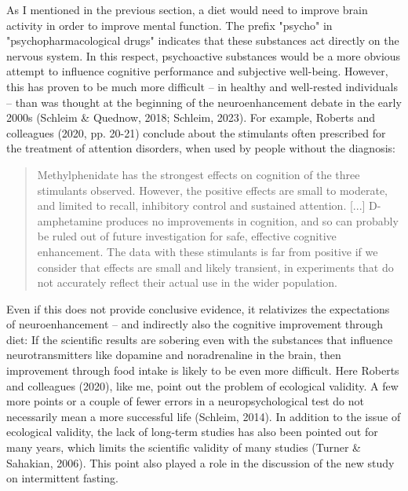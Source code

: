 \documentclass[authordate, empirical]{jote-new-article}
\begin{document}
As I mentioned in the previous section, a diet would need to improve brain activity in order to improve mental function. The prefix "psycho" in "psychopharmacological drugs" indicates that these substances act directly on the nervous system. In this respect, psychoactive substances would be a more obvious attempt to influence cognitive performance and subjective well-being. However, this has proven to be much more difficult -- in healthy and well-rested individuals -- than was thought at the beginning of the neuroenhancement debate in the early 2000s (Schleim \& Quednow, 2018; Schleim, 2023). For example, Roberts and colleagues (2020, pp. 20-21) conclude about the stimulants often prescribed for the treatment of attention disorders, when used by people without the diagnosis:






\begin{quote}

  Methylphenidate has the strongest effects on cognition of the three stimulants observed. However, the positive effects are small to moderate, and limited to recall, inhibitory control and sustained attention. [...] D-amphetamine produces no improvements in cognition, and so can probably be ruled out of future investigation for safe, effective cognitive enhancement. The data with these stimulants is far from positive if we consider that effects are small and likely transient, in experiments that do not accurately reflect their actual use in the wider population.

\end{quote}






Even if this does not provide conclusive evidence, it relativizes the expectations of neuroenhancement -- and indirectly also the cognitive improvement through diet: If the scientific results are sobering even with the substances that influence neurotransmitters like dopamine and noradrenaline in the brain, then improvement through food intake is likely to be even more difficult. Here Roberts and colleagues (2020), like me, point out the problem of ecological validity. A few more points or a couple of fewer errors in a neuropsychological test do not necessarily mean a more successful life (Schleim, 2014). In addition to the issue of ecological validity, the lack of long-term studies has also been pointed out for many years, which limits the scientific validity of many studies (Turner \& Sahakian, 2006). This point also played a role in the discussion of the new study on intermittent fasting.
\end{document}
